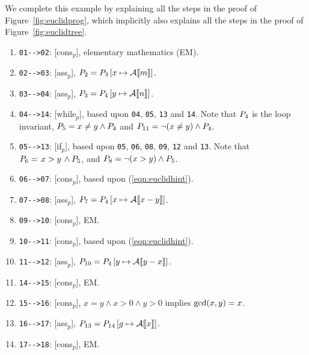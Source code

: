 \documentclass[10pt]{article}
\newcommand{\pass}[2]{\left[#1\mapsto\calA{#2}\right]}
\begin{document}
We complete this example by explaining all the steps in the proof
of Figure~\ref{fig:euclidprog}, which implicitly also explains
all the steps in the proof of Figure~\ref{fig:euclidtree}.
\begin{enumerate}
\item \verb+01-->02+: [cons$_p$], elementary mathematics (EM).
\item \verb+02-->03+: [ass$_p$], $\sptwee = \spdrie\pass{x}{m}$.
\item \verb+03-->04+: [ass$_p$], $\spdrie = \spvier\pass{y}{n}$.
\item \verb+04-->14+: [while$_p$], based upon \verb+04+, \verb+05+, \verb+13+ and \verb+14+. Note that $P_{4}$ is the loop invariant, $P_{5} = x\neq y \land P_{4}$ and $P_{11} = \neg(x\neq y) \land P_{4}$.
\item \verb+05-->13+: [if$_p$], based upon \verb+05+, \verb+06+, \verb+08+, \verb+09+, \verb+12+ and \verb+13+.
Note that $P_{6} = \left.x>y\right. \land P_{5}$, 
and $P_{8} = \neg(x>y) \land P_{5}$. 
\item \verb+06-->07+: [cons$_p$], based upon (\ref{eqn:euclidhint}).
\item \verb+07-->08+: [ass$_p$], $\spzeven = \spvier\pass{x}{x-y}$.
\item \verb+09-->10+: [cons$_p$], EM.
\item \verb+10-->11+: [cons$_p$], based upon (\ref{eqn:euclidhint}).
\item \verb+11-->12+: [ass$_p$], $\sptien = \spvier\pass{y}{y-x}$.
\item \verb+14-->15+: [cons$_p$], EM.
\item \verb+15-->16+: [cons$_p$], $x=y \wedge x>0 \wedge y>0$ implies $\mbox{gcd}(x,y)=x$.
\item \verb+16-->17+: [ass$_p$], $\spdertien = \spveertien\pass{g}{x}$.
\item \verb+17-->18+: [cons$_p$], EM.
\end{enumerate}



\end{document}
